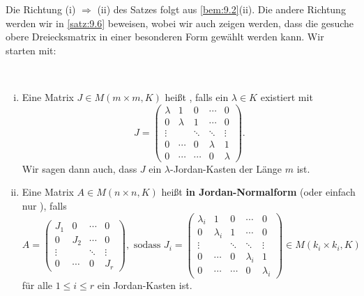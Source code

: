 Die Richtung (i) $\Rightarrow$ (ii) des Satzes folgt aus \autoref{bem:9.2}(ii).
Die andere Richtung werden wir in \autoref{satz:9.6} beweisen, wobei wir auch zeigen werden, dass die gesuche obere Dreiecksmatrix in einer besonderen Form gewählt werden kann.
Wir starten mit:

\begin{definition}
	\mbox{} \\[-1.4cm]
	\label{def:9.5}
	\begin{enumerate}[(i)]
		\item Eine Matrix $J \in M(m \times m, K)$ heißt , falls ein $\lambda \in K$ existiert mit
		\[
			J = \begin{pmatrix}
			\lambda & 1 & 0 & \cdots & 0 \\ 
			0 & \lambda & 1 & \cdots & 0 \\ 
			\vdots &  & \ddots & \ddots & \vdots \\ 
			0 & \cdots & 0 & \lambda & 1 \\ 
			0 & \cdots & \cdots & 0 & \lambda
			\end{pmatrix}.
		\]
		Wir sagen dann auch, dass $J$ ein $\lambda$-Jordan-Kasten der Länge $m$ ist.
		\item Eine Matrix $A \in M(n \times n,K)$ heißt \textbf{in Jordan-Normalform} (oder einfach nur ), falls 
		\[
			A = \begin{pmatrix}
			J_1 & 0 & \cdots & 0 \\ 
			0 & J_2 & \cdots & 0 \\ 
			\vdots &  & \ddots & \vdots \\ 
			0 & \cdots & 0 & J_r
			\end{pmatrix}, \text{ sodass }
			J_i = \begin{pmatrix}
			\lambda_i & 1 & 0 & \cdots & 0 \\ 
			0 & \lambda_i & 1 & \cdots & 0 \\ 
			\vdots &  & \ddots & \ddots & \vdots \\ 
			0 & \cdots & 0 & \lambda_i & 1 \\ 
			0 & \cdots & \cdots & 0 & \lambda_i
			\end{pmatrix} \in M(k_i \times k_i,K)
		\]
		für alle $1 \leq i \leq r$ ein Jordan-Kasten ist.
	\end{enumerate}
\end{definition}

